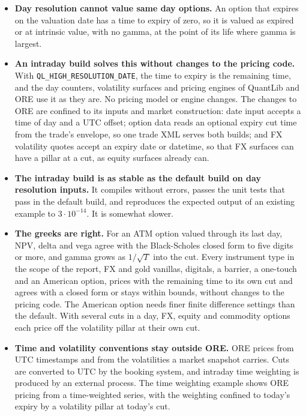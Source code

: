 \documentclass[12pt, a4paper]{article}
\begin{document}
\begin{itemize}
\item \textbf{Day resolution cannot value same day options.} An option that expires on the valuation date has a time
  to expiry of zero, so it is valued as expired or at intrinsic value, with no gamma, at the point of its life where
  gamma is largest.
\item \textbf{An intraday build solves this without changes to the pricing code.} With
  \texttt{QL\_HIGH\_RESOLUTION\_DATE}, the time to expiry is the remaining time, and the day counters, volatility
  surfaces and pricing engines of QuantLib and ORE use it as they are. No pricing model or engine changes. The
  changes to ORE are confined to its inputs and market construction: date input accepts a time of day and a UTC
  offset; option data reads an optional expiry cut time from the trade's envelope, so one trade XML serves both
  builds; and FX volatility quotes accept an expiry date or datetime, so that FX surfaces can have a pillar at a cut,
  as equity surfaces already can.
\item \textbf{The intraday build is as stable as the default build on day resolution inputs.} It compiles without
  errors, passes the unit tests that pass in the default build, and reproduces the expected output of an existing
  example to $3\cdot 10^{-14}$. It is somewhat slower.
\item \textbf{The greeks are right.} For an ATM option valued through its last day, NPV, delta and vega agree with the
  Black-Scholes closed form to five digits or more, and gamma grows as $1/\sqrt{T}$ into the cut. Every instrument
  type in the scope of the report, FX and gold vanillas, digitals, a barrier, a one-touch and an American option,
  prices with the remaining time to its own cut and agrees with a closed form or stays within bounds, without changes to
  the pricing code. The American option needs finer finite difference settings than the default. With several cuts in
  a day, FX, equity and commodity options each price off the volatility pillar at their own cut.
\item \textbf{Time and volatility conventions stay outside ORE.} ORE prices from UTC timestamps and from the
  volatilities a market snapshot carries. Cuts are converted to UTC by the booking system, and intraday time weighting is
  produced by an external process. The time weighting example shows ORE pricing from a time-weighted series, with the weighting confined to
  today's expiry by a volatility pillar at today's cut.
\end{itemize}
\end{document}

